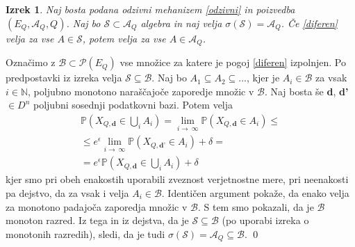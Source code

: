 \documentclass[12pt,a4paper]{amsart}
\theoremstyle{definition} %
\theoremstyle{plain} %
\newtheorem{izrek}[definicija]{Izrek}
\begin{document}
\begin{izrek}
 Naj bosta podana odzivni mehanizem \eqref{odzivni} in poizvedba $(E_Q, \mathcal{A}_Q, Q)$. Naj bo $\mathcal{S} \subset \mathcal{A}_Q$ algebra in naj velja $\sigma(\mathcal{S}) = \mathcal{A}_Q$. Če \eqref{diferen} velja za vse $A \in \mathcal{S}$, potem velja za vse $A \in \mathcal{A}_Q$. 
\end{izrek}
\proof 
Označimo z $\mathcal{B} \subset \mathcal{P}(E_Q) $ vse množice za katere je pogoj \eqref{diferen} izpolnjen. Po predpostavki iz izreka velja $\mathcal{S} \subseteq \mathcal{B}$. Naj bo $A_1 \subseteq A_2 \subseteq ... $, kjer je $A_i \in \mathcal{B}$ za vsak $i \in \mathbb{N}$, poljubno monotono naraščajoče zaporedje množic v $\mathcal{B}$. Naj bosta še \textbf{d}, \textbf{d'} $\in D^n$ poljubni sosednji podatkovni bazi. Potem velja 
\begin{equation*}
\begin{split}
\mathbb{P}(X_{Q,\textbf{d}} \in \bigcup_{i} A_i) = \lim_{i \to\ \infty} \mathbb{P}(X_{Q,\textbf{d}} \in A_i)  \leq \\
\leq  e^\epsilon\lim_{i \to\ \infty} \mathbb{P}(X_{Q,\textbf{d'}} \in A_i) + \delta = \\
=  e^\epsilon \mathbb{P}(X_{Q,\textbf{d}} \in \bigcup_{i} A_i) + \delta
\end{split}
\end{equation*}
kjer smo pri obeh enakostih uporabili zveznost verjetnostne mere, pri neenakosti pa dejstvo, da za vsak i velja $A_i \in \mathcal{B}$. Identičen argument pokaže, da enako velja za monotono padajoča zaporedja množic v $\mathcal{B}$. S tem smo pokazali, da je $\mathcal{B}$ monoton razred. Iz tega in iz dejstva, da je $\mathcal{S} \subseteq \mathcal{B}$ (po uporabi izreka o monotonih razredih), sledi, da je tudi $\sigma(\mathcal{S}) = \mathcal{A}_Q \subseteq \mathcal{B}$.
\qed
\newline
\end{document}
